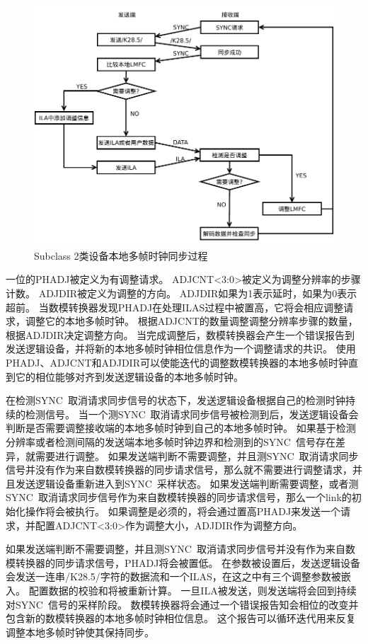 \documentclass[UTF8]{ctexart}
\begin{document}
\begin{figure}[H]
\centering
\includegraphics[width=18cm]{./img/deter_latency_subclass_2.pdf}
\caption{Subclass 2类设备本地多帧时钟同步过程}
\label{fig:deter_latency_subclass_2}
\end{figure}

一位的PHADJ被定义为有调整请求。
ADJCNT<3:0>被定义为调整分辨率的步骤计数。
ADJDIR被定义为调整的方向。
ADJDIR如果为1表示延时，如果为0表示超前。
当数模转换器发现PHADJ在处理ILAS过程中被置高，它将会相应调整请求，调整它的本地多帧时钟。
根据ADJCNT的数量调整调整分辨率步骤的数量，根据ADJDIR决定调整方向。
当完成调整后，数模转换器会产生一个错误报告到发送逻辑设备，并将新的本地多帧时钟相位信息作为一个调整请求的共识。
使用PHADJ、ADJCNT和ADJDIR可以使能迭代的调整数模转换器的本地多帧时钟直到它的相位能够对齐到发送逻辑设备的本地多帧时钟。

在检测SYNC~取消请求同步信号的状态下，发送逻辑设备根据自己的检测时钟持续的检测信号。
当一个测SYNC~取消请求同步信号被检测到后，发送逻辑设备会判断是否需要调整接收端的本地多帧时钟到自己的本地多帧时钟。
如果基于检测分辨率或者检测间隔的发送端本地多帧时钟边界和检测到的SYNC~信号存在差异，就需要进行调整。
如果发送端判断不需要调整，并且测SYNC~取消请求同步信号并没有作为来自数模转换器的同步请求信号，那么就不需要进行调整请求，并且发送逻辑设备重新进入到SYNC~采样状态。
如果发送端判断需要调整，或者测SYNC~取消请求同步信号作为来自数模转换器的同步请求信号，那么一个link的初始化操作将会被执行。
如果调整是必须的，将会通过置高PHADJ来发送一个请求，并配置ADJCNT<3:0>作为调整大小，ADJDIR作为调整方向。

如果发送端判断不需要调整，并且测SYNC~取消请求同步信号并没有作为来自数模转换器的同步请求信号，PHADJ将会被置低。
在参数被设置后，发送逻辑设备会发送一连串/K28.5/字符的数据流和一个ILAS，在这之中有三个调整参数被嵌入。
配置数据的校验和将被重新计算。
一旦ILA被发送，则发送端将会回到持续对SYNC~信号的采样阶段。
数模转换器将会通过一个错误报告知会相位的改变并包含新的数模转换器的本地多帧时钟相位信息。
这个报告可以循环迭代用来反复调整本地多帧时钟使其保持同步。
\end{document}
